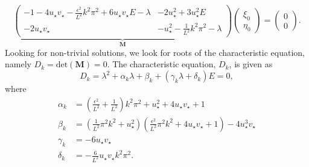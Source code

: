 \begin{equation}
\underbrace{\begin{pmatrix}-1-4u_\star v_\star-\frac{\epsilon^2}{L^2}k^2\pi^2+6u_\star v_\star E-\lambda&-2u_\star^2+3u_\star^2E\\-2u_\star v_\star&-u_\star^2-\frac{1}{L^2}k^2\pi^2-\lambda \end{pmatrix}}_{\textbf{M}}\begin{pmatrix}\xi_0\\\eta_0\end{pmatrix}=\begin{pmatrix}0\\0\end{pmatrix}.
\end{equation}
Looking for non-trivial solutions, we look for roots of the characteristic equation, namely $D_k=\text{det}(\textbf{M})=0$. The characteristic equation, $D_k$, is given as
\begin{equation}\label{characdist}
  D_k=\lambda^2+\alpha_k\lambda+\beta_k+(\gamma_k\lambda+\delta_k)E=0,
\end{equation}
where
\begin{align}
\alpha_k&=\left(\frac{\epsilon^2}{L^2}+\frac{1}{L^2}\right)k^2\pi^2+u_\star^2+4u_\star v_\star+1\\
\beta_k&=\left(\frac{1}{L^2}\pi^2k^2+u_\star^2\right)\left(\frac{\epsilon^2}{L^2}\pi^2k^2+4u_\star v_\star+1\right)-4u_\star^3v_\star\\
\gamma_k&=-6u_\star v_\star\\
\delta_k&=-\frac{6}{L^2}u_\star v_\star k^2\pi^2.
\end{align}

